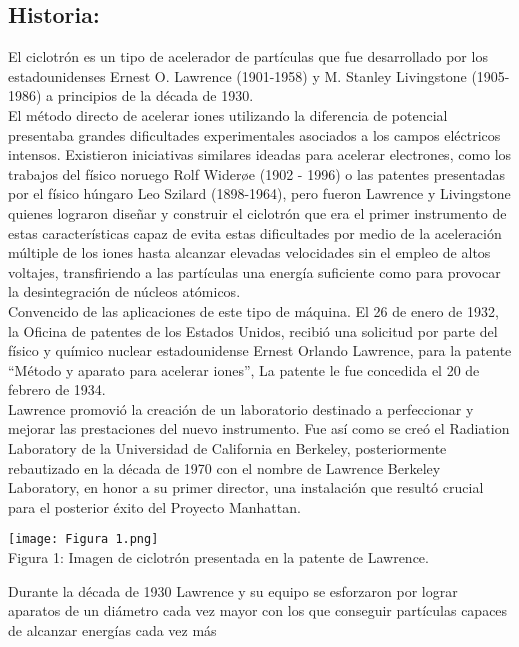 \documentclass[12pt]{article}
\begin{document}
			\subsection{Historia:}\label{subsec:Historia:}
				El ciclotrón es un tipo de acelerador de partículas que fue desarrollado por los estadounidenses 
				Ernest O. Lawrence (1901-1958) y M. Stanley Livingstone (1905-1986) a principios de la década de 
				1930. \\
				El método directo de acelerar iones utilizando la diferencia de potencial presentaba grandes 
				dificultades experimentales asociados a los campos eléctricos intensos. Existieron iniciativas 
				similares ideadas para acelerar electrones, como los trabajos del físico noruego Rolf Widerøe 
				(1902 - 1996) o las patentes presentadas por el físico húngaro Leo Szilard (1898-1964), pero fueron 
				Lawrence y Livingstone quienes lograron diseñar y construir el ciclotrón que era el primer 
				instrumento de estas características capaz de evita estas dificultades por medio de la aceleración 
				múltiple de los iones hasta alcanzar elevadas velocidades sin el empleo de altos voltajes, 
				transfiriendo a las partículas una energía suficiente como para provocar la desintegración de 
				núcleos atómicos. \\
				Convencido de las aplicaciones de este tipo de máquina. El 26 de enero de 1932, la Oficina de 
				patentes de los Estados Unidos, recibió una solicitud por parte del físico y químico nuclear 
				estadounidense Ernest Orlando Lawrence, para la patente “Método y aparato para acelerar 
				iones”, La patente le fue concedida el 20 de febrero de 1934. \\
				Lawrence promovió la creación de un laboratorio destinado a perfeccionar y mejorar las 
				prestaciones del nuevo instrumento. Fue así como se creó el Radiation Laboratory de la 
				Universidad de California en Berkeley, posteriormente rebautizado en la década de 1970 con el 
				nombre de Lawrence Berkeley Laboratory, en honor a su primer director, una instalación que 
				resultó crucial para el posterior éxito del Proyecto Manhattan.
				\begin{center}
					\texttt{[image: Figura 1.png]}\\
					Figura 1: Imagen de ciclotrón presentada en la patente de Lawrence. \cite{bib:item1}
				\end{center}
				Durante la década de 1930 Lawrence y su equipo se esforzaron por lograr aparatos de un diámetro 
				cada vez mayor con los que conseguir partículas capaces de alcanzar energías cada vez más 
\end{document}
